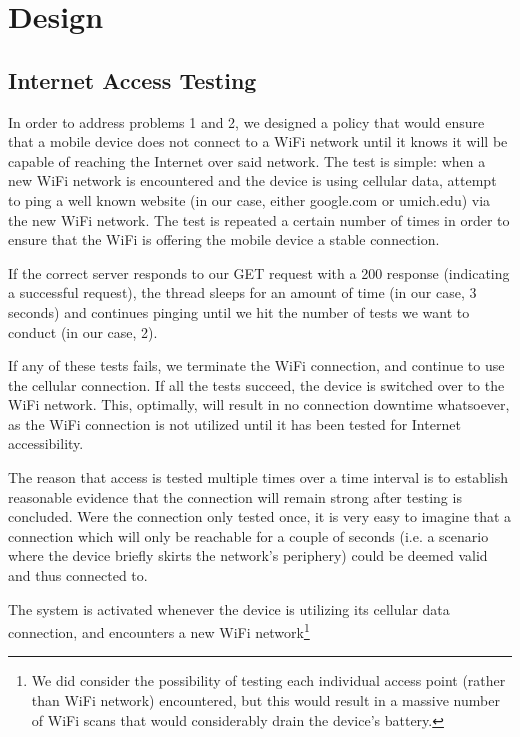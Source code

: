 \section{Design}
\label{sec:design}


\subsection{Internet Access Testing} %
In order to address problems 1 and 2, we designed a policy that would ensure that a mobile device does not connect to a WiFi network until it knows it will be capable of reaching the Internet over said network. The test is simple: when a new WiFi network is encountered and the device is using cellular data, attempt to ping a well known website (in our case, either google.com or umich.edu) via the new WiFi network. The test is repeated a certain number of times in order to ensure that the WiFi is offering the mobile device a stable connection.

If the correct server responds to our GET request with a 200 response (indicating a successful request), the thread sleeps for an amount of time (in our case, 3 seconds) and continues pinging until we hit the number of tests we want to conduct (in our case, 2).

If any of these tests fails, we terminate the WiFi connection, and continue to use the cellular connection. If all the tests succeed, the device is switched over to the WiFi network. This, optimally, will result in no connection downtime whatsoever, as the WiFi connection is not utilized until it has been tested for Internet accessibility.

The reason that access is tested multiple times over a time interval is to establish reasonable evidence that the connection will remain strong after testing is concluded. Were the connection only tested once, it is very easy to imagine that a connection which will only be reachable for a couple of seconds (i.e. a scenario where the device briefly skirts the network's periphery) could be deemed valid and thus connected to.

The system is activated whenever the device is utilizing its cellular data connection, and encounters a new WiFi network\footnote{We did consider the possibility of testing each individual access point (rather than WiFi network) encountered, but this would result in a massive number of WiFi scans that would considerably drain the device's battery.}

